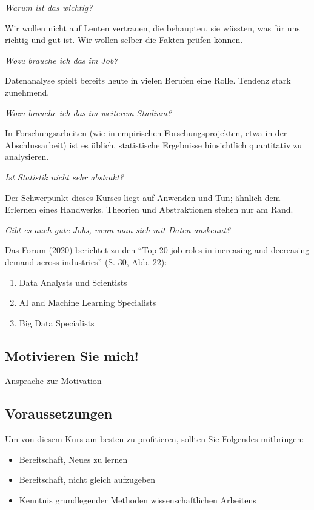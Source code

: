 \documentclass[
  a4paper,
  DIV=11]{scrreprt}
\providecommand{\tightlist}{%
  \setlength{\itemsep}{0pt}\setlength{\parskip}{0pt}}\usepackage{longtable,booktabs,array}
\theoremstyle{definition}
\theoremstyle{definition}
\theoremstyle{definition}
\theoremstyle{remark}
\begin{document}
\emph{Warum ist das wichtig?}

Wir wollen nicht auf Leuten vertrauen, die behaupten, sie wüssten, was
für uns richtig und gut ist. Wir wollen selber die Fakten prüfen können.

\emph{Wozu brauche ich das im Job?}

Datenanalyse spielt bereits heute in vielen Berufen eine Rolle. Tendenz
stark zunehmend.

\emph{Wozu brauche ich das im weiterem Studium?}

In Forschungsarbeiten (wie in empirischen Forschungsprojekten, etwa in
der Abschlussarbeit) ist es üblich, statistische Ergebnisse hinsichtlich
quantitativ zu analysieren.

\emph{Ist Statistik nicht sehr abstrakt?}

Der Schwerpunkt dieses Kurses liegt auf Anwenden und Tun; ähnlich dem
Erlernen eines Handwerks. Theorien und Abstraktionen stehen nur am Rand.

\emph{Gibt es auch gute Jobs, wenn man sich mit Daten auskennt?}

Das Forum (2020) berichtet zu den ``Top 20 job roles in increasing and
decreasing demand across industries'' (S. 30, Abb. 22):

\begin{enumerate}
\def\labelenumi{\arabic{enumi}.}
\tightlist
\item
  Data Analysts und Scientists
\item
  AI and Machine Learning Specialists
\item
  Big Data Specialists
\end{enumerate}

\subsection{Motivieren Sie mich!}\label{motivieren-sie-mich}

\href{https://youtu.be/jtNlzpcPr5Y}{Ansprache zur Motivation}

\subsection{Voraussetzungen}\label{voraussetzungen}

Um von diesem Kurs am besten zu profitieren, sollten Sie Folgendes
mitbringen:

\begin{itemize}
\tightlist
\item
  Bereitschaft, Neues zu lernen
\item
  Bereitschaft, nicht gleich aufzugeben
\item
  Kenntnis grundlegender Methoden wissenschaftlichen Arbeitens
\end{itemize}
\end{document}
